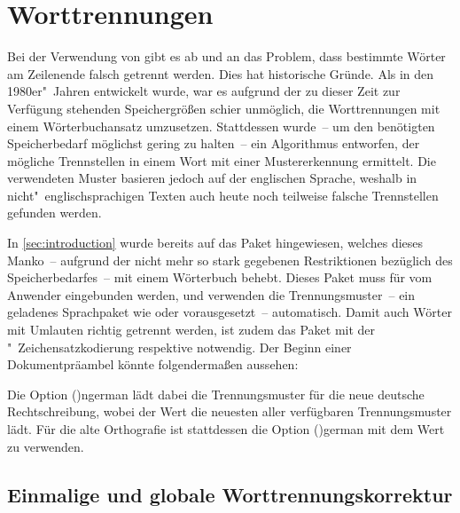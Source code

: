 \documentclass[%
  english,ngerman,%
  cdgeometry=no,DIV=12,%
  cd=false,cdfont=false,cdtitle=true,%
  headings=normal,%
  automark,%
  listof=toc,%
]{tudscrartcl}
\begin{document}
\section{%
  Worttrennungen%
  \label{sec:hyphenation}%
}

Bei der Verwendung von  gibt es ab und an das Problem, dass 
bestimmte Wörter am Zeilenende falsch getrennt werden. Dies hat historische 
Gründe. Als  in den 1980er"~Jahren entwickelt wurde, war es 
aufgrund der zu dieser Zeit zur Verfügung stehenden Speichergrößen schier 
unmöglich, die Worttrennungen mit einem Wörterbuchansatz umzusetzen. 
Stattdessen wurde~-- um den benötigten Speicherbedarf möglichst gering zu 
halten~-- ein Algorithmus entworfen, der mögliche Trennstellen in einem Wort 
mit einer Mustererkennung ermittelt. Die verwendeten Muster basieren jedoch 
auf der englischen Sprache, weshalb in nicht"~englischsprachigen Texten auch 
heute noch teilweise falsche Trennstellen gefunden werden.

In \autoref{sec:introduction} wurde bereits auf das Paket 
 hingewiesen, welches dieses Manko~-- aufgrund der nicht 
mehr so stark gegebenen Restriktionen bezüglich des Speicherbedarfes~-- mit 
einem Wörterbuch behebt. Dieses Paket muss für  vom Anwender 
eingebunden werden,  und  verwenden die 
Trennungsmuster~-- ein geladenes Sprachpaket wie  oder 
 vorausgesetzt~-- automatisch. Damit auch Wörter mit Umlauten 
richtig getrennt werden, ist zudem das Paket  mit der 
"~Zeichensatzkodierung respektive  notwendig. Der 
Beginn einer Dokumentpräambel könnte folgendermaßen aussehen:
%
%
Die Option \Option(){ngerman} lädt dabei die Trennungsmuster 
für die neue deutsche Rechtschreibung, wobei der Wert  
die neuesten aller verfügbaren Trennungsmuster lädt. Für die alte Orthografie 
ist stattdessen die Option \Option(){german} mit dem Wert 
 zu verwenden.



\subsection{Einmalige und globale Worttrennungskorrektur}
\end{document}
